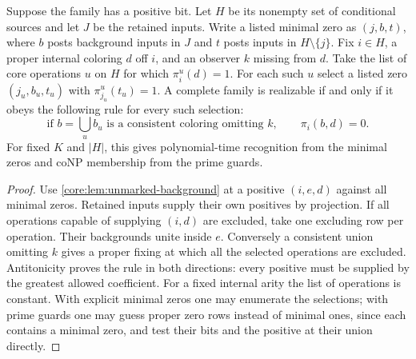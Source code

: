 \begin{theorem}
\label{core:thm:retained-background-cuts}
Suppose the family has a positive bit. Let $H$ be its nonempty set
of conditional sources and let $J$ be the retained inputs. Write a listed minimal zero as $(j,b,t)$,
where $b$ posts background inputs in $J$ and $t$ posts inputs in
$H\setminus\{j\}$. Fix $i\in H$, a proper internal coloring $d$ off
$i$, and an observer $k$ missing from $d$. Take the list of core
operations $u$ on $H$ for which $\pi_i^u(d)=1$. For each such $u$
select a listed zero $(j_u,b_u,t_u)$ with $\pi_{j_u}^u(t_u)=1$.
A complete family is realizable if and only if it obeys the following
rule for every such selection:
\[
 \text{if } b=\bigcup_u b_u\text{ is a consistent coloring omitting }k,
 \qquad \pi_i(b,d)=0.
\]
For fixed $K$ and $|H|$, this gives polynomial-time recognition
from the minimal zeros and coNP membership from the prime guards.
\end{theorem}
\begin{proof}
Use \cref{core:lem:unmarked-background} at a positive $(i,e,d)$
against all minimal zeros. Retained inputs supply their own
positives by projection. If all operations capable of supplying
$(i,d)$ are excluded, take one excluding row per operation.
Their backgrounds unite inside $e$. Conversely a consistent union
omitting $k$ gives a proper fixing at which all the selected operations
are excluded. Antitonicity proves the rule in both directions:
every positive must be supplied by the greatest allowed coefficient.
For a fixed internal arity the list of operations is constant.
With explicit minimal zeros one may enumerate the selections; with
prime guards one may guess proper zero rows instead of minimal ones,
since each contains a minimal zero, and test their bits and the
positive at their union directly.
\end{proof}

